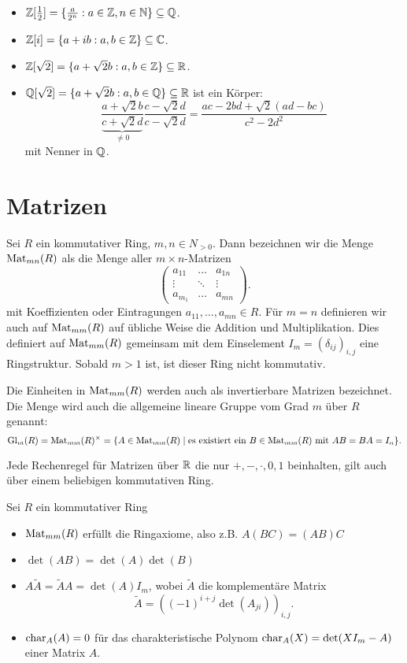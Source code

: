 \begin{eg}
	\begin{itemize}
		\item $\mathbb{Z}[\frac{1}{2}] = \{\frac{a}{2^{n}} : a \in \mathbb{Z}, n \in \mathbb{N}\} \subseteq \mathbb{Q}$.
		\item $\mathbb{Z}[i] = \{a+ib : a,b \in \mathbb{Z}\} \subseteq \mathbb{C}$. 
		\item $\mathbb{Z}[\sqrt{2}] = \{a + \sqrt{2} b: a,b \in \mathbb{Z}\} \subseteq \mathbb{R}$.
		\item $\mathbb{Q}[\sqrt{2}] = \{a+\sqrt{2} b: a,b \in \mathbb{Q}\} \subseteq \mathbb{R}$
			ist ein Körper:
			\[
			\frac{a + \sqrt{2} b}{\underbrace{c + \sqrt{2} d}_{\neq 0}} \frac{c- \sqrt{2} d}{c - \sqrt{2} d}
			= \frac{ac - 2bd + \sqrt{2} (ad-bc)}{c^2 - 2 d^2}
			\] 
			mit Nenner in $\mathbb{Q}$.
	\end{itemize}
\end{eg}

\section{Matrizen}
Sei $R$ ein kommutativer Ring, $m,n \in N_{> 0}$.
Dann bezeichnen wir die Menge $\operatorname{Mat}_{mn}(R)$ als die Menge aller $m \times n$-Matrizen
\[
\begin{pmatrix} 
a_{11} &\ldots &a_{1n}\\
\vdots &\ddots &\vdots\\
a_{m_1} &\ldots &a_{mn}
\end{pmatrix} 
.\] 
mit Koeffizienten oder Eintragungen $a_{11},\ldots,a_{mn} \in R$.
Für $m=n$ definieren wir auch auf $\operatorname{Mat}_{mm}(R)$ auf übliche Weise die Addition und Multiplikation.
Dies definiert auf $\operatorname{Mat}_{mm}(R)$ gemeinsam mit dem Einselement $I_{m} = (\delta_{ij})_{i,j}$ eine Ringstruktur.
Sobald $m > 1$ ist, ist dieser Ring nicht kommutativ.

Die Einheiten in $\operatorname{Mat}_{mm}(R)$ werden auch als invertierbare Matrizen bezeichnet.
Die Menge wird auch die allgemeine lineare Gruppe vom Grad $m$ über $R$ genannt:
\[
	\operatorname{Gl}_{m}(R) = \operatorname{Mat}_{mm}(R)^{\times} = \{A \in \operatorname{Mat}_{mm}(R) \mid \text{es existiert ein } B \in \operatorname{Mat}_{mm}(R) \text{ mit } AB = BA = I_{n}\}   
.\] 


\begin{proposition}[Meta]
	Jede Rechenregel für Matrizen über $\mathbb{R}$ die nur $+,-,\cdot,0,1$ beinhalten, gilt auch über einem beliebigen kommutativen Ring.
\end{proposition}

\begin{proposition}
	Sei $R$ ein kommutativer Ring
	\begin{itemize}
		\item $\operatorname{Mat}_{mm}(R)$ erfüllt die Ringaxiome, also z.B. $A(BC) = (AB)C$
		\item $\det(AB) = \det(A) \det(B)$
		\item  $A \widetilde{A} = \widetilde{A} A = \det(A) I_{m}$, wobei $\widetilde{A}$ die komplementäre Matrix
			\[
				\widetilde{A} = ((-1)^{i+j} \det(A_{ji}))_{i,j}
			.\] 
		\item $\operatorname{char}_{A}(A) = 0$ für das charakteristische Polynom $\operatorname{char}_{A}(X) = \det(X I_{m} - A)$ einer Matrix $A$.
	\end{itemize}
\end{proposition}

